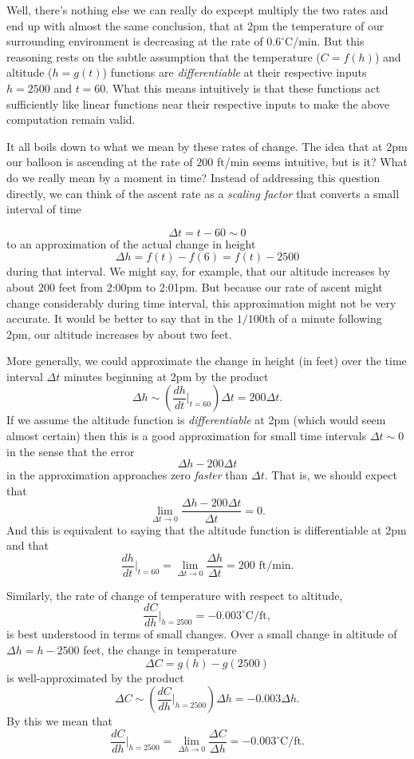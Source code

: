 \documentclass{ximera}
\begin{document}
Well, there's nothing else we can really do expcept multiply the two rates and end up with almost the same conclusion, that at 2pm the temperature of our surrounding environment is decreasing at the rate of $0.6^\circ$C/min. But this reasoning rests on the subtle assumption that the temperature ($C=f(h)$) and altitude ($h=g(t)$) functions are \emph{differentiable} at their respective inputs $h=2500$ and $t=60$. What this means intuitively is that these functions act sufficiently like linear functions near their respective inputs to make the above computation remain valid. 

It all boils down to what we mean by these rates of change. The idea that at 2pm our balloon is ascending at the rate of $200$ ft/min seems intuitive, but is it? What do we really mean by a moment in time? Instead of addressing this question directly, we can  think of the ascent rate as a \emph{scaling factor} that converts a small interval of time  

\[
 \Delta t = t-60 \sim 0
\]
to an approximation of the actual change in height 
\[
  \Delta h = f(t) - f(6) = f(t) - 2500 
\]
during that interval. We might say, for example, that our altitude increases by about $200$ feet from 2:00pm to 2:01pm. But because our rate of ascent might change considerably during time interval, this approximation might not be very accurate. It would be better to say that in the $1/100$th of a minute following 2pm, our altitude increases by about two feet. 

More generally, we could approximate the change in height (in feet) over the time interval $\Delta t$ minutes beginning at 2pm by the product
\[
         \Delta h \sim \left( \frac{dh}{dt}\Big|_{t=60}\right) \Delta t = 200 \Delta t.   
\]
If we assume the altitude function is \emph{differentiable} at 2pm (which would seem almost certain) then this is a good approximation for small time intervals $\Delta t \sim 0$ in the sense that the error
\[
      \Delta h - 200 \Delta t
\]
in the approximation approaches zero \emph{faster} than $\Delta t$. That is, we should expect that
\[
   \lim_{\Delta t \to 0} \frac{ \Delta h - 200 \Delta t}{\Delta t} = 0.
\]
And this is equivalent to saying that the altitude function is differentiable at 2pm and that
\[
    \frac{dh}{dt}\Big|_{t=60} =  \lim_{\Delta t \to 0} \frac{ \Delta h}{\Delta t} = 200 \text{ ft/min}.
\]

Similarly, the rate of change of temperature with respect to altitude,
\[
  \frac{dC}{dh}\Big|_{h=2500} = -0.003^\circ \text{C/ft} ,
\]
is best understood in terms of small changes. Over a small change in altitude of $\Delta h = h - 2500$ feet, the change in temperature
\[
         \Delta C = g(h) - g(2500)
\]
is well-approximated by the product
\[
       \Delta C \sim \left( \frac{dC}{dh}\Big|_{h=2500}\right) \Delta h = -0.003 \Delta h . 
\]
By this we mean that
\[
    \frac{dC}{dh}\Big|_{h=2500} = \lim_{\Delta h\to 0} \frac{\Delta C}{\Delta h} = -0.003^\circ \text{C/ft}.
\]
\end{document}
